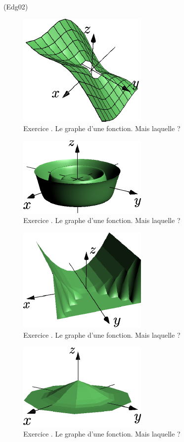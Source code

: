 \begin{tiny}(Edg02)\end{tiny}
\begin{figure}[h!t]
 \centering
 \includegraphics{./Edg02_2.pdf}
 \caption{Exercice  . Le graphe d'une fonction. Mais laquelle ?}
 \label{fig:Edg02_2}
\end{figure}
\begin{figure}[h!t]
 \centering
 \includegraphics{./Edg02_1.pdf}
 \caption{Exercice  . Le graphe d'une fonction. Mais laquelle ?}
 \label{fig:Edg02_1}
\end{figure}
\begin{figure}[h!t]
 \centering
 \includegraphics{./Edg02_4.pdf}
 \caption{Exercice  . Le graphe d'une fonction. Mais laquelle ?}
 \label{fig:Edg02_4}
\end{figure}
\begin{figure}[h!t]
 \centering
 \includegraphics{./Edg02_3.pdf}
 \caption{Exercice  . Le graphe d'une fonction. Mais laquelle ?}
 \label{fig:Edg02_3}
\end{figure}

